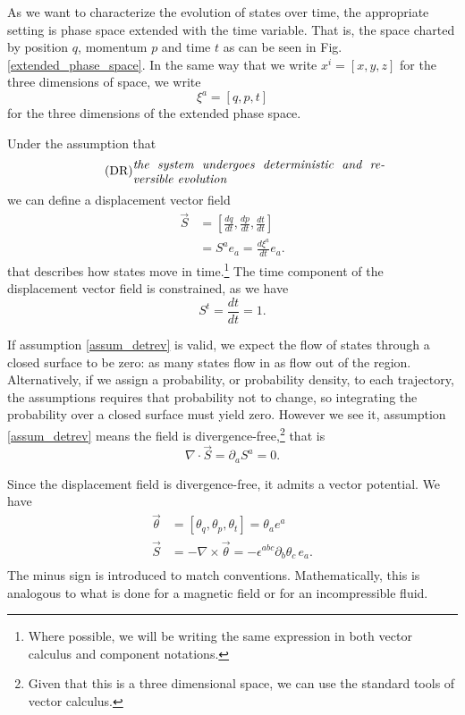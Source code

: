 \documentclass[10pt,twocolumn, nofootinbib]{revtex4-2}
\begin{document}
As we want to characterize the evolution of states over time, the appropriate setting is phase space extended with the time variable\cite{lanczos1949variational,synge1960encyclopedia}. That is, the space charted by position $q$, momentum $p$ and time $t$ as can be seen in Fig. \ref{extended_phase_space}. In the same way that we write $x^i = [ x, y, z ]$ for the three dimensions of space, we write
\begin{equation}\label{sdof_variables}
	\xi^a = [ q, p, t]
\end{equation}
for the three dimensions of the extended phase space.

Under the assumption that
\begin{align}\label{assum_detrev}
	\tag*{(DR)}
	\parbox{2.8in}{\emph{the system undergoes deterministic and reversible evolution}}
\end{align}
we can define a displacement vector field
\begin{equation}\label{sdof_displacement}
\begin{aligned}
	\vec{S} &= \left[ \frac{dq}{dt},\frac{dp}{dt},\frac{dt}{dt} \right] \\
	&= S^a e_a = \frac{d\xi^a}{dt} e_a .
\end{aligned}
\end{equation}
that describes how states move in time.\footnote{Where possible, we will be writing the same expression in both vector calculus and component notations.} The time component of the displacement vector field is constrained, as we have
\begin{equation}\label{sdof_time_constraint}
	S^t=\frac{dt}{dt}=1.
\end{equation}

If assumption \ref{assum_detrev} is valid, we expect the flow of states through a closed surface to be zero: as many states flow in as flow out of the region. Alternatively, if we assign a probability, or probability density, to each trajectory, the assumptions requires that probability not to change, so integrating the probability over a closed surface must yield zero. However we see it, assumption \ref{assum_detrev} means the field is divergence-free,\footnote{Given that this is a three dimensional space, we can use the standard tools of vector calculus.} that is
\begin{equation}\label{sdof_div_free}
	\nabla \cdot \vec{S} = \partial_a S^a = 0.
\end{equation}

Since the displacement field is divergence-free, it admits a vector potential. We have
\begin{equation}\label{sdof_displacement_potential}
\begin{aligned}
	\vec{\theta} &= [\theta_q, \theta_p, \theta_t] = \theta_a e^a \\
	\vec{S} &= - \nabla \times \vec{\theta} = - \epsilon^{abc} \partial_b \theta_c \, e_a. \\
\end{aligned}
\end{equation}
The minus sign is introduced to match conventions. Mathematically, this is analogous to what is done for a magnetic field or for an incompressible fluid.
\end{document}
